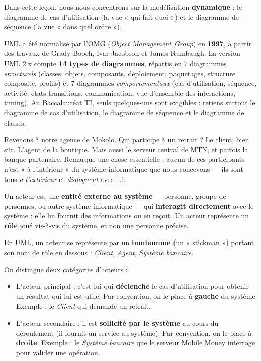\documentclass[11pt]{article}
\newcommand{\cle}[1]{{\popxbold\color{popdark}#1}}
\newcounter{popsec}
\newcounter{popsub}
\newcommand{\courssub}[1]{%
  \stepcounter{popsub}%
  \par\vspace{9pt}\noindent{\popxbold\fontsize{11.5}{13}\selectfont\color{popink}{\color{poporange}\thepopsec.\thepopsub}\hspace{6pt}#1}\par\nopagebreak\vspace{4pt}
}
\begin{document}
Dans cette leçon, nous nous concentrons sur la modélisation \textbf{dynamique} : le diagramme de cas d'utilisation (la vue « qui fait quoi ») et le diagramme de séquence (la vue « dans quel ordre »).

\begin{savaistu}
UML a été normalisé par l'\cle{OMG} (\emph{Object Management Group}) en \textbf{1997}, à partir des travaux de Grady Booch, Ivar Jacobson et James Rumbaugh. La version UML 2.x compte \textbf{14 types de diagrammes}, répartis en 7 diagrammes \emph{structurels} (classes, objets, composants, déploiement, paquetages, structure composite, profils) et 7 diagrammes \emph{comportementaux} (cas d'utilisation, séquence, activité, états-transitions, communication, vue d'ensemble des interactions, timing). Au Baccalauréat TI, seuls quelques-uns sont exigibles : retiens surtout le diagramme de cas d'utilisation, le diagramme de séquence et le diagramme de classes.
\end{savaistu}

\courssub{Les acteurs : qui interagit avec le système ?}

Revenons à notre agence de Mokolo. Qui participe à un retrait ? Le client, bien sûr. L'agent de la boutique. Mais aussi le serveur central de MTN, et parfois la banque partenaire. Remarque une chose essentielle : aucun de ces participants n'est « à l'intérieur » du système informatique que nous concevons — ils sont tous \emph{à l'extérieur} et \emph{dialoguent} avec lui.

\begin{definition}[Acteur]
Un \cle{acteur} est une \textbf{entité externe au système} — personne, groupe de personnes, ou autre système informatique — qui \textbf{interagit directement} avec le système : elle lui fournit des informations ou en reçoit. Un acteur représente un \textbf{rôle} joué vis-à-vis du système, et non une personne précise.
\end{definition}

En UML, un acteur se représente par un \textbf{bonhomme} (un « stickman ») portant son nom de rôle en dessous : \emph{Client}, \emph{Agent}, \emph{Système bancaire}.

On distingue deux catégories d'acteurs :

\begin{itemize}
\item L'\cle{acteur principal} : c'est lui qui \textbf{déclenche} le cas d'utilisation pour obtenir un résultat qui lui est utile. Par convention, on le place à \textbf{gauche} du système. Exemple : le \emph{Client} qui demande un retrait.
\item L'\cle{acteur secondaire} : il est \textbf{sollicité par le système} au cours du déroulement (il fournit un service au système). Par convention, on le place à \textbf{droite}. Exemple : le \emph{Système bancaire} que le serveur Mobile Money interroge pour valider une opération.
\end{itemize}
\end{document}
